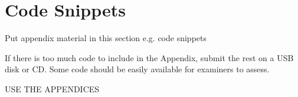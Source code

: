 \chapter{Code Snippets}

Put appendix material in this section e.g. code snippets 

 If there is too much code to include in the Appendix, submit the rest on a USB disk or CD. Some code should be easily available for examiners to assess.
 
USE THE APPENDICES